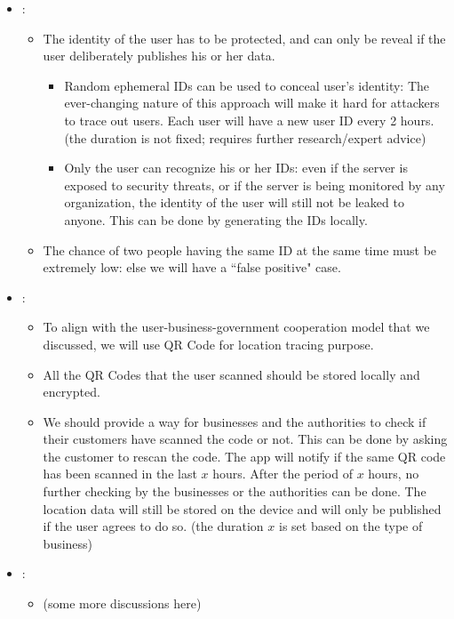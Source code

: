     \begin{itemize}
      \item {}:
        \begin{itemize}
          \item The identity of the user has to be protected, and can only be reveal if the user deliberately publishes his or her data.
            \begin{itemize}
              \item Random ephemeral IDs can be used to conceal user's identity: The ever-changing nature of this approach will make it hard for attackers to trace out users. Each user will have a new user ID every 2 hours. (the duration is not fixed; requires further research/expert advice)
              \item Only the user can recognize his or her IDs: even if the server is exposed to security threats, or if the server is being monitored by any organization, the identity of the user will still not be leaked to anyone. This can be done by generating the IDs locally.
            \end{itemize}
          \item The chance of two people having the same ID at the same time must be extremely low: else we will have a ``false positive" case.
        \end{itemize}
      \item {}:
        \begin{itemize}
          \item To align with the user-business-government cooperation model that we discussed, we will use QR Code for location tracing purpose.
          \item All the QR Codes that the user scanned should be stored locally and encrypted.
          \item We should provide a way for businesses and the authorities to check if their customers have scanned the code or not. This can be done by asking the customer to rescan the code. The app will notify if the same QR code has been scanned in the last $x$ hours. After the period of $x$ hours, no further checking by the businesses or the authorities can be done. The location data will still be stored on the device and will only be published if the user agrees to do so. (the duration $x$ is set based on the type of business)
        \end{itemize}
      \item {}:
        \begin{itemize}
          \item (some more discussions here)
        \end{itemize}
    \end{itemize}

